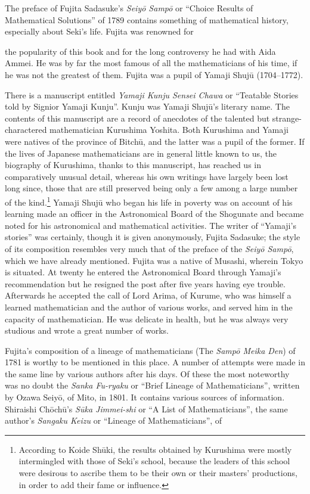 \documentclass[11pt]{article}
\newcommand{\scanpage}[2]{\clearpage\setcounter{footnote}{0}\noindent{\footnotesize\color{gray}PDF page #1 · #2}\par\medskip}
\begin{document}
The preface of Fujita Sadasuke's \emph{Seiyō Sampō} or ``Choice Results of Mathematical Solutions'' of 1789 contains something of mathematical history, especially about Seki's life. Fujita was renowned for

\scanpage{0338}{printed page 324 (top left)}
\noindent the popularity of this book and for the long controversy he had with Aida Ammei. He was by far the most famous of all the mathematicians of his time, if he was not the greatest of them. Fujita was a pupil of Yamaji Shujū (1704--1772).

There is a manuscript entitled \emph{Yamaji Kunju Sensei Chawa} or ``Teatable Stories told by Signior Yamaji Kunju''. Kunju was Yamaji Shujū's literary name. The contents of this manuscript are a record of anecdotes of the talented but strange-charactered mathematician Kurushima Yoshita. Both Kurushima and Yamaji were natives of the province of Bitchū, and the latter was a pupil of the former. If the lives of Japanese mathematicians are in general little known to us, the biography of Kurushima, thanks to this manuscript, has reached us in comparatively unusual detail, whereas his own writings have largely been lost long since, those that are still preserved being only a few among a large number of the kind.\footnote{According to Koide Shūki, the results obtained by Kurushima were mostly intermingled with those of Seki's school, because the leaders of this school were desirous to ascribe them to be their own or their masters' productions, in order to add their fame or influence.} Yamaji Shujū who began his life in poverty was on account of his learning made an officer in the Astronomical Board of the Shogunate and became noted for his astronomical and mathematical activities. The writer of ``Yamaji's stories'' was certainly, though it is given anonymously, Fujita Sadasuke; the style of its composition resembles very much that of the preface of the \emph{Seiyō Sampō}, which we have already mentioned. Fujita was a native of Musashi, wherein Tokyo is situated. At twenty he entered the Astronomical Board through Yamaji's recommendation but he resigned the post after five years having eye trouble. Afterwards he accepted the call of Lord Arima, of Kurume, who was himself a learned mathematician and the author of various works, and served him in the capacity of mathematician. He was delicate in health, but he was always very studious and wrote a great number of works.

Fujita's composition of a lineage of mathematicians (The \emph{Sampō Meika Den}) of 1781 is worthy to be mentioned in this place. A number of attempts were made in the same line by various authors after his days. Of these the most noteworthy was no doubt the \emph{Sanka Fu-ryaku} or ``Brief Lineage of Mathematicians'', written by Ozawa Seiyō, of Mito, in 1801. It contains various sources of information. Shiraishi Chōchū's \emph{Sūka Jimmei-shi} or ``A List of Mathematicians'', the same author's \emph{Sangaku Keizu} or ``Lineage of Mathematicians'', of
\end{document}
